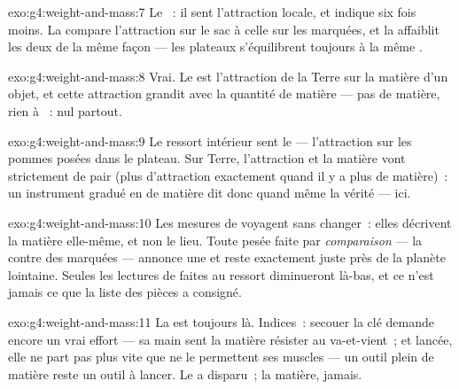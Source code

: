 \begin{solution}{exo:g4:weight-and-mass:7}
Le ~: il sent l'attraction locale, et indique six fois
moins. La  compare l'attraction sur le sac à celle sur les
 marquées, et la  affaiblit les deux de la même façon ---
les plateaux s'équilibrent toujours à la même .
\end{solution}

\begin{solution}{exo:g4:weight-and-mass:8}
Vrai. Le  est l'attraction de la Terre sur la matière d'un
objet, et cette attraction grandit avec la quantité de matière --- pas
de matière, rien à ~:  nul partout.
\end{solution}

\begin{solution}{exo:g4:weight-and-mass:9}
Le ressort intérieur sent le \emph{} --- l'attraction sur les
pommes posées dans le plateau. Sur Terre, l'attraction et la matière
vont strictement de pair (plus d'attraction exactement quand il y a
plus de matière)~: un instrument gradué en  de matière dit
donc quand même la vérité --- ici.
\end{solution}

\begin{solution}{exo:g4:weight-and-mass:10}
Les mesures de  voyagent sans changer~: elles décrivent la
matière elle-même, et non le lieu. Toute pesée faite par
\emph{comparaison} --- la  contre des  marquées ---
annonce une  et reste exactement juste près de la planète
lointaine. Seules les lectures de  faites au ressort
diminueront là-bas, et ce n'est jamais ce que la liste des pièces a
consigné.
\end{solution}

\begin{solution}{exo:g4:weight-and-mass:11}
La  est toujours là. Indices~: secouer la clé demande encore un
vrai effort --- sa main sent la matière résister au va-et-vient~; et
lancée, elle ne part pas plus vite que ne le permettent ses
muscles --- un outil plein de matière reste un outil à lancer. Le
 a disparu~; la matière, jamais.
\end{solution}
